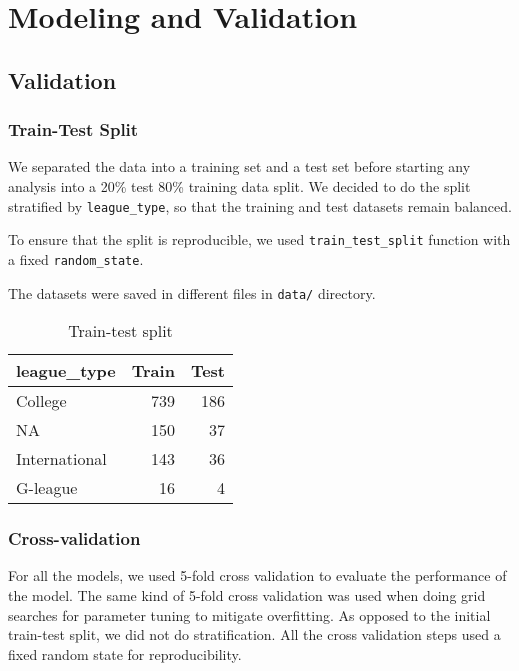 
\section{Modeling and Validation}%
\label{sec:modeling-and-validation}

\subsection{Validation}%
\label{sub:validation}

\subsubsection{Train-Test Split}%

We separated the data into a training set and a test set before starting any analysis
into a 20\% test 80\% training data split. We decided to do the split stratified by
\texttt{league\_type}, so that the training and test datasets remain balanced.

To ensure that the split is reproducible,
we used \texttt{train\_test\_split} function with a fixed \texttt{random\_state}.

The datasets were saved in different files in \texttt{data/} directory.

%
\begin{table}[htb]
\centering
\caption{Train-test split}
\label{tab:train-test-split}
\begin{tabular}{lrr}
  \toprule
  \textbf{league\_type} & \textbf{Train} & \textbf{Test} \\
  \midrule
  College        &  739  & 186 \\
  NA             &  150  &  37 \\
  International  &  143  &  36 \\
  G-league       &   16  &   4 \\
  \bottomrule
\end{tabular}
\end{table}

\subsubsection{Cross-validation}%
\label{ssub:cross-validation}

For all the models, we used 5-fold cross validation to evaluate the performance
of the model. The same kind of 5-fold cross validation was used when doing grid
searches for parameter tuning to mitigate overfitting. As opposed to the initial
train-test split, we did not do stratification. All the cross validation steps
used a fixed random state for reproducibility.

